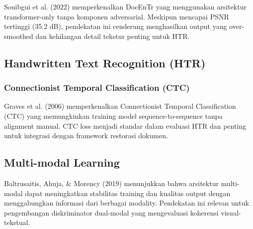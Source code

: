 \documentclass[12pt,a4paper]{article}
\begin{document}
Souibgui et al. (2022) memperkenalkan DocEnTr yang menggunakan arsitektur transformer-only tanpa komponen adversarial. Meskipun mencapai PSNR tertinggi (35.2 dB), pendekatan ini cenderung menghasilkan output yang over-smoothed dan kehilangan detail tekstur penting untuk HTR.

\subsection{Handwritten Text Recognition (HTR)}

\subsubsection{Connectionist Temporal Classification (CTC)}

Graves et al. (2006) memperkenalkan Connectionist Temporal Classification (CTC) yang memungkinkan training model sequence-to-sequence tanpa alignment manual. CTC loss menjadi standar dalam evaluasi HTR dan penting untuk integrasi dengan framework restorasi dokumen.

\subsection{Multi-modal Learning}

Baltrusaitis, Ahuja, \& Morency (2019) menunjukkan bahwa arsitektur multi-modal dapat meningkatkan stabilitas training dan kualitas output dengan menggabungkan informasi dari berbagai modality. Pendekatan ini relevan untuk pengembangan diskriminator dual-modal yang mengevaluasi koherensi visual-tekstual.


\end{document}
